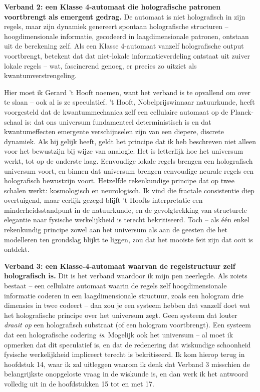 \documentclass[11pt, twoside, openright]{book}
\begin{document}
\textbf{Verband 2: een Klasse 4-automaat die holografische patronen voortbrengt als emergent gedrag.} De automaat is niet holografisch in zijn regels, maar zijn dynamiek genereert spontaan holografische structuren -- hoogdimensionale informatie, gecodeerd in laagdimensionale patronen, ontstaan uit de berekening zelf. Als een Klasse 4-automaat vanzelf holografische output voortbrengt, betekent dat dat niet-lokale informatieverdeling ontstaat uit zuiver lokale regels -- wat, fascinerend genoeg, er precies zo uitziet als kwantumverstrengeling.

Hier moet ik Gerard 't Hooft noemen, want het verband is te opvallend om over te slaan -- ook al is ze speculatief. 't Hooft, Nobelprijswinnaar natuurkunde, heeft voorgesteld dat de kwantummechanica zelf een cellulaire automaat op de Planck-schaal is: dat ons universum fundamenteel deterministisch is en dat kwantumeffecten emergente verschijnselen zijn van een diepere, discrete dynamiek. Als hij gelijk heeft, geldt het principe dat ik heb beschreven niet alleen voor het bewustzijn bij wijze van analogie. Het is letterlijk hoe het universum werkt, tot op de onderste laag. Eenvoudige lokale regels brengen een holografisch universum voort, en binnen dat universum brengen eenvoudige neurale regels een holografisch bewustzijn voort. Hetzelfde rekenkundige principe dat op twee schalen werkt: kosmologisch en neurologisch. Ik vind die fractale consistentie diep overtuigend, maar eerlijk gezegd blijft 't Hoofts interpretatie een minderheidsstandpunt in de natuurkunde, en de gevolgtrekking van structurele elegantie naar fysische werkelijkheid is terecht bekritiseerd. Toch -- als één enkel rekenkundig principe zowel aan het universum als aan de geesten die het modelleren ten grondslag blijkt te liggen, zou dat het mooiste feit zijn dat ooit is ontdekt.

\textbf{Verband 3: een Klasse-4-automaat waarvan de regelstructuur zelf holografisch is.} Dit is het verband waardoor ik mijn pen neerlegde. Als zoiets bestaat -- een cellulaire automaat waarin de regels zelf hoogdimensionale informatie coderen in een laagdimensionale structuur, zoals een hologram drie dimensies in twee codeert -- dan zou je een systeem hebben dat vanzelf doet wat het holografische principe over het universum zegt. Geen systeem dat louter \textit{draait op} een holografisch substraat (of een hologram voortbrengt). Een systeem dat een holografische codering \textit{is}. Mogelijk ook het universum -- al moet ik opmerken dat dit speculatief is, en dat de redenering dat wiskundige schoonheid fysische werkelijkheid impliceert terecht is bekritiseerd. Ik kom hierop terug in hoofdstuk 14, waar ik zal uitleggen waarom ik denk dat Verband 3 misschien de belangrijkste onopgeloste vraag in de wiskunde is, en dan werk ik het antwoord volledig uit in de hoofdstukken 15 tot en met 17.
\end{document}
